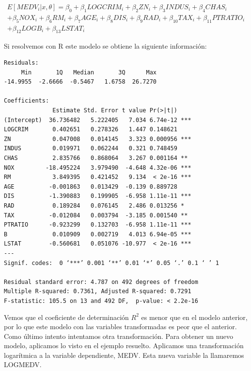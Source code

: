 \documentclass[12pt,a4paper,twoside,openright,titlepage,final]{article}
\begin{document}
\begin{multline*}
E[MEDV_i |x, \theta] = \beta_0 + \beta_1 LOGCRIM_i + \beta_2 ZN_i + \beta_3 INDUS_i + \beta_4 CHAS_i \\ + \beta_5 NOX_i + \beta_6 RM_i + \beta_7 AGE_i + \beta_8 DIS_i + \beta_9 RAD_i + \beta_{10} TAX_i + \beta_{11} PTRATIO_i \\ + \beta_{12} LOGB_i + \beta_{13} LSTAT_i
\end{multline*}

Si resolvemos con R este modelo se obtiene la siguiente información:

\begin{verbatim}
Residuals:
     Min       1Q   Median       3Q      Max 
-14.9955  -2.6666  -0.5467   1.6758  26.7270 

Coefficients:
              Estimate Std. Error t value Pr(>|t|)    
(Intercept)  36.736482   5.222405   7.034 6.74e-12 ***
LOGCRIM       0.402651   0.278326   1.447 0.148621    
ZN            0.047008   0.014145   3.323 0.000956 ***
INDUS         0.019971   0.062244   0.321 0.748459    
CHAS          2.835766   0.868064   3.267 0.001164 ** 
NOX         -18.495224   3.979490  -4.648 4.32e-06 ***
RM            3.849395   0.421452   9.134  < 2e-16 ***
AGE          -0.001863   0.013429  -0.139 0.889728    
DIS          -1.390883   0.199905  -6.958 1.11e-11 ***
RAD           0.189284   0.076145   2.486 0.013256 *  
TAX          -0.012084   0.003794  -3.185 0.001540 ** 
PTRATIO      -0.923299   0.132703  -6.958 1.11e-11 ***
B             0.010909   0.002719   4.013 6.94e-05 ***
LSTAT        -0.560681   0.051076 -10.977  < 2e-16 ***
---
Signif. codes:  0 ‘***’ 0.001 ‘**’ 0.01 ‘*’ 0.05 ‘.’ 0.1 ‘ ’ 1 

Residual standard error: 4.787 on 492 degrees of freedom
Multiple R-squared: 0.7361,	Adjusted R-squared: 0.7291 
F-statistic: 105.5 on 13 and 492 DF,  p-value: < 2.2e-16 
\end{verbatim}

Vemos que el coeficiente de determinación $R^2$ es menor que en el modelo anterior, por lo que este modelo con las variables transformadas es peor que el anterior.\\

Como último intento intentamos otra transformación. Para obtener un nuevo modelo, aplicamos lo visto en el ejemplo resuelto. Aplicamos una transformación logarítmica a la variable dependiente, MEDV. Esta nueva variable la llamaremos LOGMEDV.\\
\end{document}
